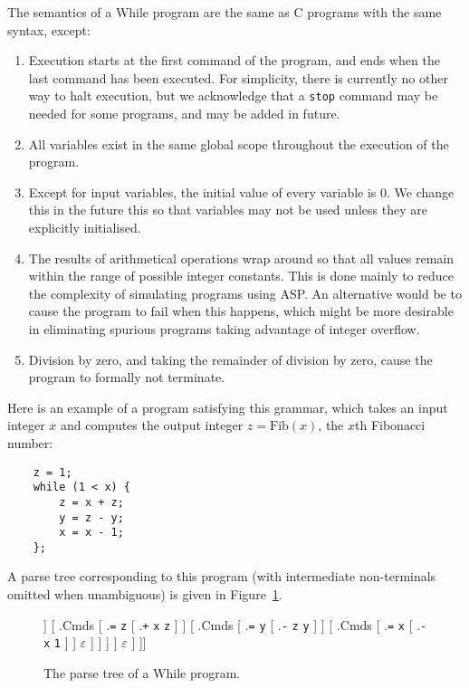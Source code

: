 \documentclass[a4paper,twoside,notitlepage]{article}
\newcommand{\ttt}{\texttt}
\newcommand{\trm}{\textrm}
\begin{document}
The semantics of a While program are the same as C programs with the same 
syntax, except:
\begin{enumerate}
    \item Execution starts at the first command of the program, and ends when 
    the last command has been executed. For simplicity, there is currently no 
    other way to halt execution, but we acknowledge that a \ttt{stop} command 
    may be needed for some programs, and may be added in future.
    \item All variables exist in the same global scope throughout the 
    execution of the program.
    \item Except for input variables, the initial value of every variable is 0.
    We change this in the future this so that variables may not be used unless 
    they are explicitly initialised.
    \item The results of arithmetical operations wrap around so that all 
    values remain within the range of possible integer constants. This is done 
    mainly to reduce the complexity of simulating programs using ASP. An 
    alternative would be to cause the program to fail when this happens, which 
    might be more desirable in eliminating spurious programs taking advantage 
    of integer overflow.
    \item Division by zero, and taking the remainder of division by zero,
    cause the program to formally not terminate.
\end{enumerate}

Here is an example of a program satisfying this grammar, which takes an input 
integer $x$ and computes the output integer $z=\trm{Fib}(x)$, the $x$th 
Fibonacci number:
\begin{verbatim}
    z = 1;
    while (1 < x) {
        z = x + z;
        y = z - y;
        x = x - 1;
    };
\end{verbatim}

A parse tree corresponding to this program (with intermediate non-terminals 
omitted when unambiguous) is given in Figure~\ref{fig:fibtree}.

\begin{figure}[h]
  \caption{The parse tree of a While program.}
  \label{fig:fibtree}
  \Tree[ .Prog [ .Cmds
    [ .\ttt{=} \ttt{x} \ttt{1} ]
    [ .Cmds
      [ .\ttt{while}
        [ .Bool [ .\ttt{<} \ttt{1} \ttt{x} ] ]
        [ .Cmds
          [ .\ttt{=} \ttt{z} [ .\ttt{+} \ttt{x} \ttt{z} ] ]
            [ .Cmds
              [ .\ttt{=} \ttt{y} [ .\ttt{-} \ttt{z} \ttt{y} ] ]
              [ .Cmds
                [ .\ttt{=} \ttt{x} [ .\ttt{-} \ttt{x} \ttt{1} ] ]
                $\varepsilon$
              ]
            ]
          ]
        ]
      $\varepsilon$
    ]
  ]]
\end{figure}
\end{document}

